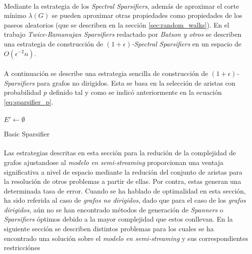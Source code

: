 \documentclass{subfiles}
\begin{document}
        \paragraph{}
        Mediante la estrategia de los \emph{Spectral Sparsifiers}, además de aproximar el corte mínimo $\lambda(G)$ se pueden aproximar otras propiedades como propiedades de los paseos aleatorios (que se describen en la sección \ref{sec:random_walks}). En el trabajo \emph{Twice-Ramanujan Sparsifiers} \cite{batson2012twice} redactado por \emph{Batson y otros} se describen una estrategia de construcción de \emph{$(1 +\epsilon)$-Spectral Sparsifiers} en un espacio de $O(\epsilon^{-2}n)$.

        \paragraph{}
        A continuación se describe una estrategia sencilla de construcción de \emph{$(1 +\epsilon)$-Sparsifiers} para grafos no dirigidos. Esta se basa en la selección de aristas con probabilidad $p$ definido tal y como se indicó anteriormente en la ecuación \eqref{eq:sparsifier_p}.

        \paragraph{}
        \begin{algorithm}
          \SetAlgoLined
          $E' \gets \emptyset$\;
          \caption{Basic Sparsifier}
          \label{code:basic_sparsifier}
        \end{algorithm}

        \paragraph{}
        Las estrategias descritas en esta sección para la redución de la complejidad de grafos ajustandose al \emph{modelo en semi-streaming} proporcionan una ventaja significativa a nivel de espacio mediante la redución del conjunto de aristas para la resolución de otros problemas a partir de ellas. Por contra, estas generan una determinada tasa de error. Cuando se ha hablado de optimalidad en esta sección, ha sido referida al caso de \emph{grafos no dirigidos}, dado que para el caso de los \emph{grafos dirigidos}, aún no se han encontrado métodos de generación de \emph{Spanners} o \emph{Sparsifiers} óptimos debido a la mayor complejidad que estos conllevan. En la siguiente sección se describen distintos problemas para los cuales se ha encontrado una solución sobre el \emph{modelo en semi-streaming} y sus correspondientes restricciónes
\end{document}
